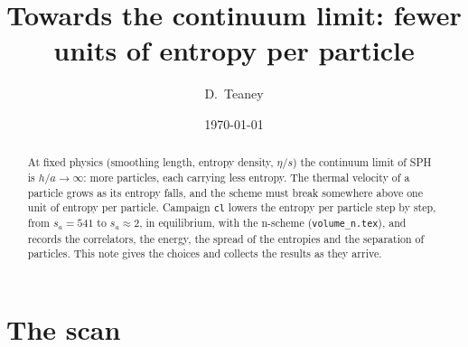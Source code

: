 \documentclass[11pt,aps,preprint,nofootinbib,superscriptaddress,tightenlines]{revtex4-2}
\begin{document}
\title{Towards the continuum limit: fewer units of entropy per particle}
\author{D.~Teaney}
\date{\today}

\begin{abstract}
At fixed physics (smoothing length, entropy density, $\eta/s$) the continuum limit of SPH
is $h/a\to\infty$: more particles, each carrying less entropy.  The thermal velocity of a
particle grows as its entropy falls, and the scheme must break somewhere above one unit of
entropy per particle.  Campaign \texttt{cl} lowers the entropy per particle step by step,
from $s_a=541$ to $s_a\approx2$, in equilibrium, with the n-scheme (\texttt{volume\_n.tex}),
and records the correlators, the energy, the spread of the entropies and the separation of
particles.  This note gives the choices and collects the results as they arrive.
\end{abstract}

\maketitle

\section{The scan}
\label{sec:scan}
\end{document}
